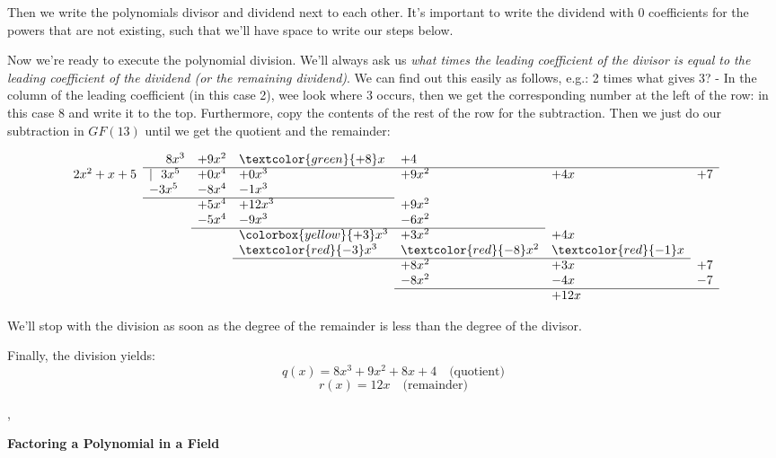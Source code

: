 Then we write the polynomials divisor and dividend next to each other. It's
important to write the dividend with 0 coefficients for the powers that are not
existing, such that we'll have space to write our steps below.

Now we're ready to execute the polynomial division. We'll always ask us
\emph{what times the leading coefficient of the divisor is equal to the leading
coefficient of the dividend (or the remaining dividend)}. We can find out this
easily as follows, e.g.: 2 times what gives 3? - In the column of the leading
coefficient (in this case 2), wee look where 3 occurs, then we get the
corresponding number at the left of the row: in this case 8 and write it to the
top. Furthermore, copy the contents of the rest of the row for the
subtraction. Then we just do our subtraction in $GF(13)$ until we get the
quotient and the remainder:

\[
\begin{array}{lllllll}
         & \ \ \ \ 8x^3 &+9x^2 & \textcolor{green}{+8}x &+4\\
\cline{2-7}
2x^2+x+5 & | \ \ 3x^5 &+0x^4 &+0x^3 &+9x^2 & +4x & +7\\
         & -3x^5 & -8x^4 & -1x^3\\
\cline{2-4}
         &       & +5x^4 & +12x^3 & +9x^2\\
         &       & -5x^4 & -9x^3  & -6x^2\\
\cline{3-5}
         &       &       & \colorbox{yellow}{+3}x^3  & +3x^2 & +4x\\
         &       &       & \textcolor{red}{-3}x^3  & \textcolor{red}{-8}x^2
         & \textcolor{red}{-1}x\\
\cline{4-6}
         &       &       &        & +8x^2 & +3x & +7\\
         &       &       &        & -8x^2 & -4x & -7\\
\cline{5-7}
         &       &       &        &       & +12x\\
                         
\end{array}
\]

We'll stop with the division as soon as the degree of the remainder is less than
the degree of the divisor.

Finally, the division yields:
\[
q(x) = 8x^3+9x^2+8x+4 \quad \text{(quotient)}
\]
\[
r(x) = 12x \quad \text{(remainder)}
\]

\sep

\textbf{Factoring a Polynomial in a Field}

